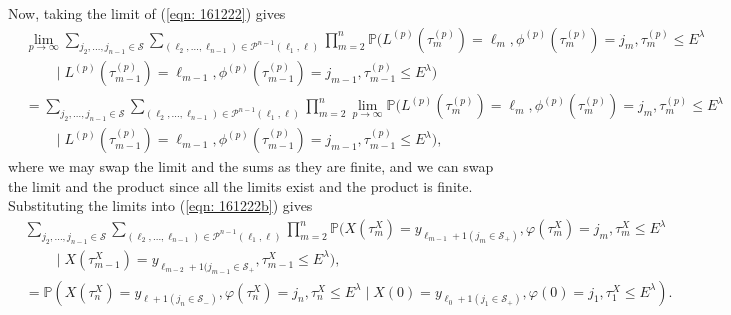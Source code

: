 Now, taking the limit of (\ref{eqn: 161222}) gives 
\begin{align}
	&\lim_{p\to\infty}\sum_{j_2,\dots,j_{n-1}\in\mathcal S}\sum_{(\ell_2,\dots,\ell_{n-1}) \in\mathcal P^{n-1}(\ell_1,\ell)}\prod_{m=2}^{n}\mathbb P(L^{(p)}(\tau_m^{(p)}) = \ell_m, \phi^{(p)}(\tau_m^{(p)}) = j_m, \tau_{m}^{(p)}\leq E^\lambda \nonumber
            	 \\&\qquad\mid L^{(p)}(\tau_{m-1}^{(p)}) = \ell_{m-1}, 
	 	 \phi^{(p)}(\tau_{m-1}^{(p)}) = j_{m-1}, \tau_{m-1}^{(p)}\leq E^\lambda) \nonumber 
	\\ &=\sum_{j_2,\dots,j_{n-1}\in\mathcal S}\sum_{(\ell_2,\dots,\ell_{n-1}) \in\mathcal P^{n-1}(\ell_1,\ell)}\prod_{m=2}^{n}\lim_{p\to\infty} \mathbb P(L^{(p)}(\tau_m^{(p)}) = \ell_m, \phi^{(p)}(\tau_m^{(p)}) = j_m, \tau_{m}^{(p)}\leq E^\lambda \nonumber
            	 \\&\qquad \mid L^{(p)}(\tau_{m-1}^{(p)}) = \ell_{m-1}, 
	 	 \phi^{(p)}(\tau_{m-1}^{(p)}) = j_{m-1}, \tau_{m-1}^{(p)}\leq E^\lambda),
	 \label{eqn: 161222b}
\end{align}
where we may swap the limit and the sums as they are finite, and we can swap the limit and the product since all the limits exist and the product is finite. Substituting the limits into (\ref{eqn: 161222b}) gives 
\begin{align}
	&\sum_{j_2,\dots,j_{n-1}\in\mathcal S}\sum_{(\ell_2,\dots,\ell_{n-1})  \in\mathcal P^{n-1}(\ell_1,\ell)} \prod_{m=2}^{n}\mathbb P(X(\tau_m^X) = y_{\ell_{m-1}+1(j_{m}\in\mathcal S_+)}, \varphi(\tau_m^X) = j_m, \tau_{m}^X\leq E^\lambda \nonumber
            	\\&\qquad \mid X(\tau_{m-1}^X)=y_{\ell_{m-2}+1(j_{m-1}\in\mathcal S_+},\tau_{m-1}^X\leq E^\lambda),\nonumber
		\\&= \mathbb P(X(\tau_n^X) = y_{\ell+1(j_{n}\in\mathcal S_-)}, 
		\varphi(\tau_n^X) = j_n, \tau_{n}^X\leq E^\lambda \mid X(0)=y_{\ell_{0}+1(j_{1}\in\mathcal S_+)},
		\varphi(0)=j_{1},\tau_1^X\leq E^\lambda).
\end{align}

